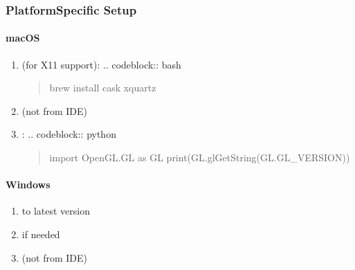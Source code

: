 \documentclass[a4paper,10pt,english,openany,oneside]{sphinxmanual}
\begin{document}
\subsubsection{Platform\sphinxhyphen{}Specific Setup}
\label{\detokenize{legacy_examples:platform-specific-setup}}

\paragraph{macOS}
\label{\detokenize{legacy_examples:macos}}\begin{enumerate}
%
\item {} 
\sphinxAtStartPar
{} (for X11 support):
.. code\sphinxhyphen{}block:: bash
\begin{quote}

\sphinxAtStartPar
brew install \textendash{}cask xquartz
\end{quote}

\item {} 
\sphinxAtStartPar
{} (not from IDE)

\item {} 
\sphinxAtStartPar
{}:
.. code\sphinxhyphen{}block:: python
\begin{quote}

\sphinxAtStartPar
import OpenGL.GL as GL
print(GL.glGetString(GL.GL\_VERSION))
\end{quote}

\end{enumerate}


\paragraph{Windows}
\label{\detokenize{legacy_examples:windows}}\begin{enumerate}
%
\item {} 
\sphinxAtStartPar
{} to latest version

\item {} 
\sphinxAtStartPar
{} if needed

\item {} 
\sphinxAtStartPar
{} (not from IDE)

\end{enumerate}
\end{document}
